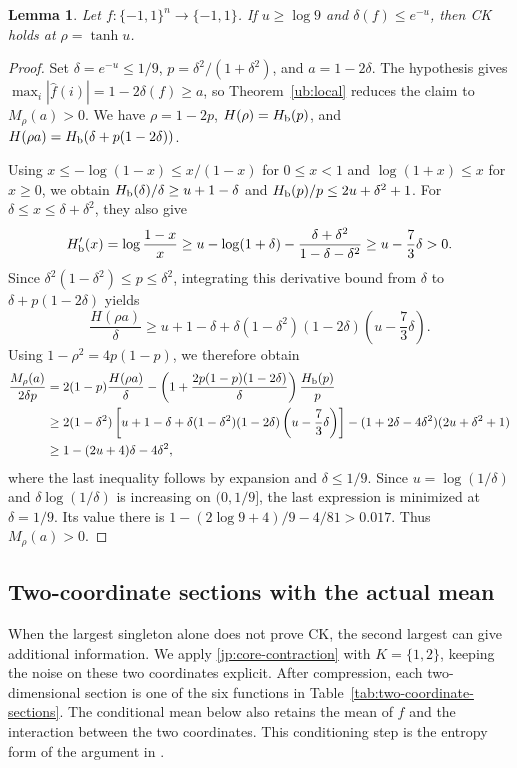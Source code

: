 \documentclass[11pt,letterpaper]{amsart}
\newcommand{\1}{\mathbf 1}
\newtheorem{lemma}[theorem]{Lemma}
\numberwithin{equation}{section}
\begin{document}
\begin{lemma}\label{ub:exponential-local}
Let $f:\{-1,1\}^n\to\{-1,1\}$. If $u\ge\log9$ and
$\delta(f)\le e^{-u}$, then CK holds at
$\rho=\tanh u$.
\end{lemma}

\begin{proof}
Set $\delta=e^{-u}\le1/9$, $p=\delta^2/(1+\delta^2)$,
and $a=1-2\delta$. The hypothesis gives
$\max_i|\widehat f(i)|=1-2\delta(f)\ge a$,
so Theorem~\ref{ub:local} reduces the claim to
$M_\rho(a)>0$.
We have $\rho=1-2p$, $H(\rho)=H_{\rm b}(p)$, and
$H(\rho a)=H_{\rm b}(\delta+p(1-2\delta))$.

Using $x\le-\log(1-x)\le x/(1-x)$ for $0\le x<1$
and $\log(1+x)\le x$ for $x\ge0$, we obtain
$H_{\rm b}(\delta)/\delta\ge u+1-\delta$ and
$H_{\rm b}(p)/p\le2u+\delta^2+1$.
For $\delta\le x\le\delta+\delta^2$, they also give
\[
 H_{\rm b}'(x)=\log\frac{1-x}{x}
 \ge u-\log(1+\delta)
       -\frac{\delta+\delta^2}{1-\delta-\delta^2}
 \ge u-\frac73\delta>0.
\]
Since $\delta^2(1-\delta^2)\le p\le\delta^2$,
integrating this derivative bound from $\delta$ to
$\delta+p(1-2\delta)$ yields
\[
 \frac{H(\rho a)}{\delta}
 \ge u+1-\delta
   +\delta(1-\delta^2)(1-2\delta)
      \left(u-\frac73\delta\right).
\]
Using $1-\rho^2=4p(1-p)$, we therefore obtain
\[
 \begin{aligned}
 \frac{M_\rho(a)}{2\delta p}
 &=2(1-p)\frac{H(\rho a)}{\delta}
   -\left(1+\frac{2p(1-p)(1-2\delta)}{\delta}\right)
      \frac{H_{\rm b}(p)}p\\
 &\ge2(1-\delta^2)
   \left[u+1-\delta
     +\delta(1-\delta^2)(1-2\delta)
       \left(u-\frac73\delta\right)\right] -(1+2\delta-4\delta^2)(2u+\delta^2+1)\\
 &\ge1-(2u+4)\delta-4\delta^2,
 \end{aligned}
\]
where the last inequality follows by expansion and
$\delta\le1/9$.
Since $u=\log(1/\delta)$ and
$\delta\log(1/\delta)$ is increasing on $(0,1/9]$,
the last expression is minimized at $\delta=1/9$.
Its value there is
$1-(2\log9+4)/9-4/81>0.017$.
Thus $M_\rho(a)>0$.
\end{proof}

\subsection{Two-coordinate sections with the actual mean}

When the largest singleton alone does not prove CK, the second
largest can give additional information. We apply
\eqref{jp:core-contraction} with $K=\{1,2\}$, keeping the noise on
these two coordinates explicit. After compression, each two-dimensional
section is one of the six functions in
Table~\ref{tab:two-coordinate-sections}. The conditional mean below
also retains the mean of $f$ and the interaction between the two
coordinates. This conditioning step is the entropy form of the argument in
\cite[proof of Theorem~6.2]{Yu2026Local}.
\end{document}
